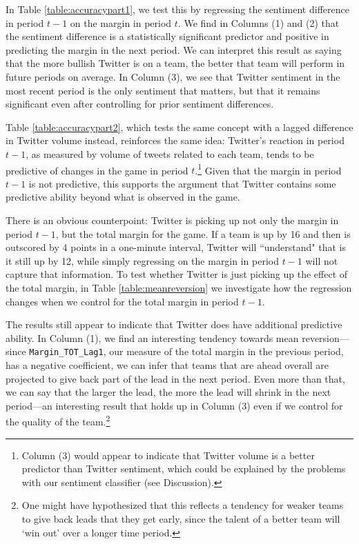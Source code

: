 \documentclass[12pt]{article}
\begin{document}
\begin{doublespacing}
In Table \ref{table:accuracypart1}, we test this by regressing the sentiment difference in period $t-1$ on the margin in period $t$. We find in Columns (1) and (2) that the sentiment difference is a statistically significant predictor and positive in predicting the margin in the next period. We can interpret this result as saying that the more bullish Twitter is on a team, the better that team will perform in future periods on average. In Column (3), we see that Twitter sentiment in the most recent period is the only sentiment that matters, but that it remains significant even after controlling for prior sentiment differences. 

Table \ref{table:accuracypart2}, which tests the same concept with a lagged difference in Twitter volume instead, reinforces the same idea: Twitter's reaction in period $t-1$, as measured by volume of tweets related to each team, tends to be predictive of changes in the game in period $t$.\footnote{Column (3) would appear to indicate that Twitter volume is a better predictor than Twitter sentiment, which could be explained by the problems with our sentiment classifier (see Discussion).} Given that the margin in period $t-1$ is not predictive, this supports the argument that Twitter contains some predictive ability beyond what is observed in the game. 

There is an obvious counterpoint: Twitter is picking up not only the margin in period $t-1$, but the total margin for the game. If a team is up by 16 and then is outscored by 4 points in a one-minute interval, Twitter will ``understand" that is it still up by 12, while simply regressing on the margin in period $t-1$ will not capture that information. To test whether Twitter is just picking up the effect of the total margin, in Table \ref{table:meanreversion} we investigate how the regression changes when we control for the total margin in period $t-1$.

The results still appear to indicate that Twitter does have additional predictive ability. In Column (1), we find an interesting tendency towards mean reversion---since \texttt{Margin\_TOT\_Lag1}, our measure of the total margin in the previous period, has a negative coefficient, we can infer that teams that are ahead overall are projected to give back part of the lead in the next period. Even more than that, we can say that the larger the lead, the more the lead will shrink in the next period---an interesting result that holds up in Column (3) even if we control for the quality of the team.\footnote{One might have hypothesized that this reflects a tendency for weaker teams to give back leads that they get early, since the talent of a better team will `win out' over a longer time period.}


\end{doublespacing}
\end{document}
